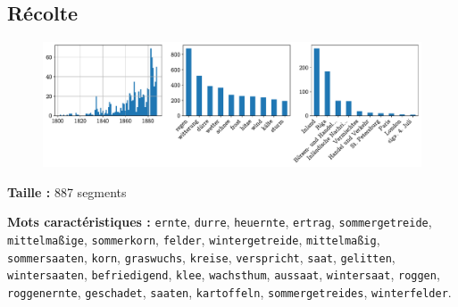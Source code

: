 \documentclass[a4paper,twoside,12pt]{article}
\begin{document}
\clearpage



\subsection*{Récolte} \label{topic2_recolte}

\begin{figure}[H]
\centering
\includegraphics[width=\textwidth]{images/topic_charts_2.pdf}
\end{figure}

\begin{flushleft}
\textbf{Taille :} 887 segments

\textbf{Mots caractéristiques :} \texttt{ernte}, \texttt{durre}, \texttt{heuernte}, \texttt{ertrag}, \texttt{sommergetreide}, \texttt{mittelmaßige}, \texttt{sommerkorn}, \texttt{felder}, \texttt{wintergetreide}, \texttt{mittelmaßig}, \texttt{sommersaaten}, \texttt{korn}, \texttt{graswuchs}, \texttt{kreise}, \texttt{verspricht}, \texttt{saat}, \texttt{gelitten}, \texttt{wintersaaten}, \texttt{befriedigend}, \texttt{klee}, \texttt{wachsthum}, \texttt{aussaat}, \texttt{wintersaat}, \texttt{roggen}, \texttt{roggenernte}, \texttt{geschadet}, \texttt{saaten}, \texttt{kartoffeln}, \texttt{sommergetreides}, \texttt{winterfelder}.
\end{flushleft}

\medskip
\end{document}
